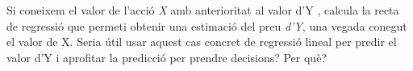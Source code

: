 \begin{autoaval}{40}
\begin{mylist}
\begin{tasks}
	\task  Si coneixem el valor de l'acció \textit{X} amb anterioritat al valor d'Y , calcula la recta de regressió que permeti obtenir una estimació del preu \textit{d'Y}, una vegada conegut el valor de X.
	\task Seria útil usar aquest cas concret de regressió lineal per predir el valor d'Y  i aprofitar la predicció per prendre decisions? Per què?
\end{tasks}
 
 	
 
 
\end{mylist}
\end{autoaval}
\vspace*{\fill}